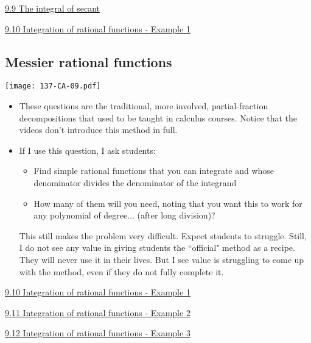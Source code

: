\documentclass[11pt]{article}
\newcommand{\nl}{\hfill \vspace{-1.1\baselineskip}} %
\newcommand{\vix}{\hspace{8mm} \href{https://www.youtube.com/watch?v=OT5DTVFfvFA&list=PLlwePzQY_wW_DPAQSBjQmMs0hF8T7yVkF&index=9}{9.9 The integral of secant}}
\newcommand{\vx}{\hspace{8mm} \href{https://www.youtube.com/watch?v=w-T90XSM90s&list=PLlwePzQY_wW_DPAQSBjQmMs0hF8T7yVkF&index=10}{9.10 Integration of rational functions - Example 1}}
\newcommand{\vxi}{\hspace{8mm} \href{https://www.youtube.com/watch?v=XwuohSB1e5w&list=PLlwePzQY_wW_DPAQSBjQmMs0hF8T7yVkF&index=11}{9.11 Integration of rational functions - Example 2}}
\newcommand{\vxii}{\hspace{8mm} \href{https://www.youtube.com/watch?v=NjmH5KjYS2k&list=PLlwePzQY_wW_DPAQSBjQmMs0hF8T7yVkF&index=12}{9.12 Integration of rational functions - Example 3}}
\begin{document}
\begin{videos}
\vix

\vx
\end{videos}

\newpage
\subsection{Messier rational functions}

\begin{center}
{ \texttt{[image: 137-CA-09.pdf]}} 
\end{center}

\begin{comments}
\nl
	\begin{itemize}
		\item These questions are the traditional, more involved, partial-fraction decompositions that used to be taught in calculus courses.  Notice that the videos don't introduce this method in full.  
		\item If I use this question, I ask students:
			\begin{itemize}
				\item Find simple rational functions that you can integrate and whose denominator divides the denominator of the integrand
				\item How many of them will you need, noting that you want this to work for any polynomial of degree... (after long division)?
			\end{itemize}
			This still makes the problem very difficult.  Expect students to struggle.  Still, I do not see any value in giving students the ``official" method as a recipe.  They will never use it in their lives.  But I see value is struggling to come up with the method, even if they do not fully complete it.
	\end{itemize}
\end{comments}

\begin{videos}
\vx

\vxi

\vxii
\end{videos}
\end{document}
